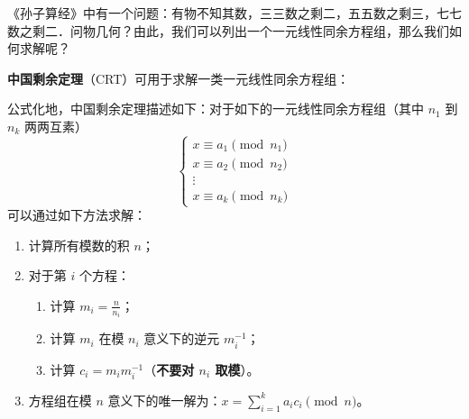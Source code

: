 《孙子算经》中有一个问题：有物不知其数，三三数之剩二，五五数之剩三，七七数之剩二．问物几何？由此，我们可以列出一个一元线性同余方程组，那么我们如何求解呢？

\textbf{中国剩余定理}（CRT）可用于求解一类一元线性同余方程组：

公式化地，中国剩余定理描述如下：对于如下的一元线性同余方程组（其中 $n_1$ 到 $n_k$ 两两互素）
\[
\begin{cases}
	x \equiv a_1 \pmod{n_1} \\
	x \equiv a_2 \pmod{n_2} \\
	\vdots \\
	x \equiv a_k \pmod{n_k}
\end{cases}
\]
可以通过如下方法求解：
\begin{enumerate}
	\item 计算所有模数的积 $n$；
	\item 对于第 $i$ 个方程：
	\begin{enumerate}
		\item 计算 $m_i = \frac{n}{n_i}$；
		\item 计算 $m_i$ 在模 $n_i$ 意义下的逆元 $m_i^{-1}$；
		\item 计算 $c_i = m_i m_i^{-1}$（\textbf{不要对 $n_i$ 取模}）。
	\end{enumerate}
	\item 方程组在模 $n$ 意义下的唯一解为：$x = \sum\limits_{i=1}^k a_i c_i \pmod{n}$。
\end{enumerate}